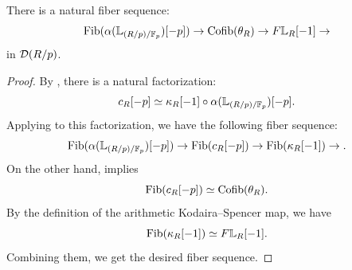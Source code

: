 \documentclass[11pt,a4paper]{amsart}
\begin{document}
\begin{theorem}\label{corollary2.9}
    There is a natural fiber sequence:
    \[\operatorname{Fib}(\alpha(\mathbb{L}_{(R/p)/\mathbb{F}_p})[-p])\to \operatorname{Cofib}(\theta_R)\to F\mathbb{L}_R[-1]\to\] in $\mathcal{D}(R/p)$.
\end{theorem}
\begin{proof}
    By , there is a natural factorization:
    \[c_R[-p]\simeq \kappa_R[-1]\circ \alpha(\mathbb{L}_{(R/p)/\mathbb{F}_p})[-p].\]
    Applying  to this factorization, we have the following fiber sequence:
    \[\operatorname{Fib}(\alpha(\mathbb{L}_{(R/p)/\mathbb{F}_p})[-p])\to \operatorname{Fib}(c_R[-p])\to \operatorname{Fib}(\kappa_R[-1])\to.\]
    On the other hand,  implies \[\operatorname{Fib}(c_R[-p])\simeq \operatorname{Cofib}(\theta_R).\]
    By the definition of the arithmetic Kodaira--Spencer map, we have 
    \[\operatorname{Fib}(\kappa_R[-1])\simeq F\mathbb{L}_R[-1].\]
    Combining them, we get the desired fiber sequence.
\end{proof}
\end{document}

